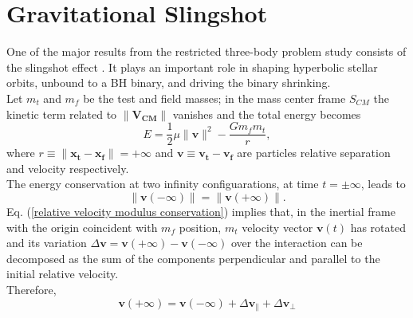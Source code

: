 \documentclass[12pt,twoside,openany]{book}
\begin{document}
\section{Gravitational Slingshot}\label{sec:Gravitational Slingshot Effect}
One of the major results from the restricted three-body problem study consists of the slingshot effect \cite{Mikkola_1992}. It plays an important role in shaping hyperbolic stellar orbits, unbound to a BH binary, and driving the binary shrinking.\\Let $m_t$ and $m_f$ be the test and field masses; in the mass center frame $S_{CM}$ the kinetic term related to $\|\mathbf{V_{CM}}\|$ vanishes and the total energy becomes
\begin{equation}\label{E in S_cm }
    E=\frac{1}{2}\mu\|\mathbf{v}\|^2-\frac{Gm_fm_t}{r},
\end{equation}
 where  $r\equiv \|\mathbf{x_t}-\mathbf{x_f}\|=+\infty$ and $\mathbf{v}\equiv \mathbf{v_t}-\mathbf{v_f}$ are particles relative separation and velocity respectively.\\The energy conservation at two infinity configuarations, at time $t=\pm \infty$, leads to 
\begin{equation}\label{relative velocity modulus conservation}
     \|\mathbf{v}(-\infty)\|=  \|\mathbf{v}(+\infty)\|.
\end{equation}
Eq. (\ref{relative velocity modulus conservation}) implies that, in the inertial frame with the origin coincident with $m_f$ position, $m_t$ velocity vector $\mathbf{v}(t)$ has rotated and its variation $\Delta\mathbf{v}=\mathbf{v}(+\infty)-\mathbf{v}(-\infty)$ over the interaction can be decomposed  as the sum of the components perpendicular
and parallel to the initial relative velocity.\\Therefore, 
\begin{equation}
    \mathbf{v}(+\infty)=\mathbf{v}(-\infty)+\Delta\mathbf{v}_\parallel +\Delta\mathbf{v}_\perp
\end{equation}
\end{document}

